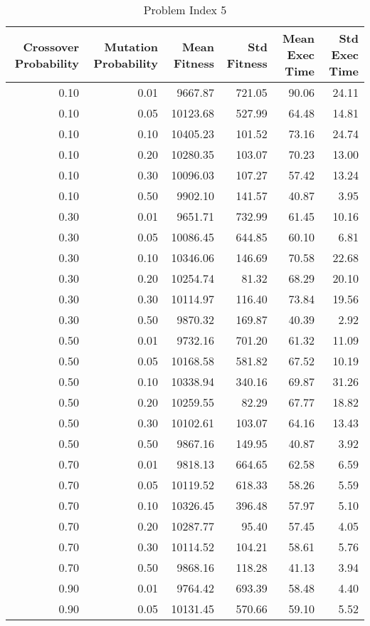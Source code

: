\begin{table}
\caption{Problem Index 5}
\label{tab:problem_5}
\begin{tabular}{rrrrrr}
\toprule
Crossover Probability & Mutation Probability & Mean Fitness & Std Fitness & Mean Exec Time & Std Exec Time \\
\midrule
0.10 & 0.01 & 9667.87 & 721.05 & 90.06 & 24.11 \\
0.10 & 0.05 & 10123.68 & 527.99 & 64.48 & 14.81 \\
0.10 & 0.10 & 10405.23 & 101.52 & 73.16 & 24.74 \\
0.10 & 0.20 & 10280.35 & 103.07 & 70.23 & 13.00 \\
0.10 & 0.30 & 10096.03 & 107.27 & 57.42 & 13.24 \\
0.10 & 0.50 & 9902.10 & 141.57 & 40.87 & 3.95 \\
0.30 & 0.01 & 9651.71 & 732.99 & 61.45 & 10.16 \\
0.30 & 0.05 & 10086.45 & 644.85 & 60.10 & 6.81 \\
0.30 & 0.10 & 10346.06 & 146.69 & 70.58 & 22.68 \\
0.30 & 0.20 & 10254.74 & 81.32 & 68.29 & 20.10 \\
0.30 & 0.30 & 10114.97 & 116.40 & 73.84 & 19.56 \\
0.30 & 0.50 & 9870.32 & 169.87 & 40.39 & 2.92 \\
0.50 & 0.01 & 9732.16 & 701.20 & 61.32 & 11.09 \\
0.50 & 0.05 & 10168.58 & 581.82 & 67.52 & 10.19 \\
0.50 & 0.10 & 10338.94 & 340.16 & 69.87 & 31.26 \\
0.50 & 0.20 & 10259.55 & 82.29 & 67.77 & 18.82 \\
0.50 & 0.30 & 10102.61 & 103.07 & 64.16 & 13.43 \\
0.50 & 0.50 & 9867.16 & 149.95 & 40.87 & 3.92 \\
0.70 & 0.01 & 9818.13 & 664.65 & 62.58 & 6.59 \\
0.70 & 0.05 & 10119.52 & 618.33 & 58.26 & 5.59 \\
0.70 & 0.10 & 10326.45 & 396.48 & 57.97 & 5.10 \\
0.70 & 0.20 & 10287.77 & 95.40 & 57.45 & 4.05 \\
0.70 & 0.30 & 10114.52 & 104.21 & 58.61 & 5.76 \\
0.70 & 0.50 & 9868.16 & 118.28 & 41.13 & 3.94 \\
0.90 & 0.01 & 9764.42 & 693.39 & 58.48 & 4.40 \\
0.90 & 0.05 & 10131.45 & 570.66 & 59.10 & 5.52 \\

\end{tabular}
\end{table}
